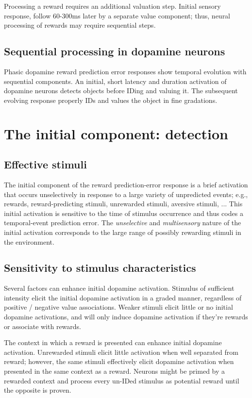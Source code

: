 \documentclass{article}
\numberwithin{equation}{section}
\begin{document}
Processing a reward requires an additional valuation step. Initial sensory response, follow 60-300ms later by a separate value component; thus, neural processing of rewards may require sequential steps.

\subsection{Sequential processing in dopamine neurons}

Phasic dopamine reward prediction error responses show temporal evolution with sequential components. An initial, short latency and duration activation of dopamine neurons detects objects before IDing and valuing it. The subsequent evolving response properly IDs and values the object in fine gradations.

\section{The initial component: detection}
\subsection{Effective stimuli}

The initial component of the reward prediction-error response is a brief activation that occurs unselectively in response to a large variety of unpredicted events; e.g., rewards, reward-predicting stimuli, unrewarded stimuli, aversive stimuli, ... This initial activation is sensitive to the time of stimulus occurrence and thus codes a temporal-event prediction error. The \textit{unselective} and \textit{multisensory} nature of the initial activation corresponds to the large range of possibly rewarding stimuli in the environment.

\subsection{Sensitivity to stimulus characteristics}

Several factors can enhance initial dopamine activation. Stimulus of sufficient intensity elicit the initial dopamine activation in a graded manner, regardless of positive / negative value associations. Weaker stimuli elicit little or no initial dopamine activations, and will only induce dopamine activation if they're rewards or associate with rewards.

The context in which a reward is presented can enhance initial dopamine activation. Unrewarded stimuli elicit little activation when well separated from reward; however, the same stimuli effectively elicit dopamine activation when presented in the same context as a reward. Neurons might be primed by a rewarded context and process every un-IDed stimulus as potential reward until the opposite is proven.
\end{document}
